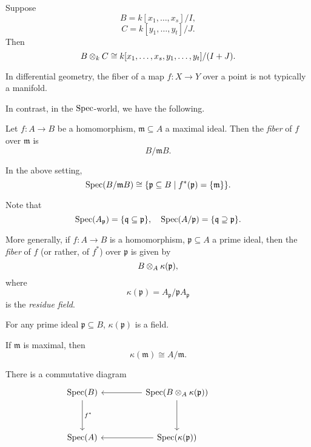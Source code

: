 \begin{corollary}
  Suppose
  \[ B = k[x_1, \dotsc, x_s] / {I},\]
  \[ C = k[y_1, \dotsc, y_t] /{J}.\]
  Then
  \[ B \otimes_k C \cong k[x_1, \dotsc, x_s, y_1, \dotsc, y_t] / {(I + J)}.\]
\end{corollary}

In differential geometry, the fiber of a map $f \colon X \to Y$ over a point is not typically a manifold.

In contrast, in the $\text{Spec}$-world, we have the following.

\begin{df}
  Let $f \colon A \to B$ be a homomorphism, $\mathfrak m \subseteq A$ a maximal ideal. Then the \textit{fiber} of $f$ over $\mathfrak m$ is
  \[ B /{\mathfrak m B}.\]
\end{df}

\begin{prop}
  In the above setting,
  \[\text{Spec}(B /{\mathfrak m B}) \cong \{ \mathfrak p \subseteq B \mathrel{|} f^*(\mathfrak p) = \{ \mathfrak m \} \}.\]
\end{prop}

Note that
\[ \text{Spec}(A_{\mathfrak p}) = \{ \mathfrak q \subseteq \mathfrak p\}, \quad
\text{Spec}(A /{\mathfrak p}) = \{ \mathfrak q \supseteq \mathfrak p\}.\]

\begin{df}
  More generally, if $f \colon A \to B$ is a homomorphism, $\mathfrak p \subseteq A$ a prime ideal, then the \textit{fiber} of $f$ (or rather, of \(f^*\)) over $\mathfrak p$ is given by
  \[ B \otimes_A \kappa(\mathfrak p),\]
  where
  \[ \kappa(\mathfrak p) = A_{\mathfrak p} / {\mathfrak p A_{\mathfrak p}}\]
  is the \textit{residue field}.
\end{df}

\begin{prop}
  For any prime ideal $\mathfrak p \subseteq B$, $\kappa(\mathfrak p)$ is a field.
\end{prop}

\begin{note}
  If $\mathfrak m$ is maximal, then
  \[ \kappa(\mathfrak m) \cong A / {\mathfrak m}.\]
\end{note}

\begin{prop}
  There is a commutative diagram
  \begin{equation*}
    \begin{tikzcd}[row sep = huge, column sep = huge]
      \spec(B) \arrow{d}{f^*}
      & \spec(B \tensor_A \kappa(\mathfrak p)) \arrow{l} \arrow{d} \\
      \spec(A) &
      \spec(\kappa(\mathfrak p)) \arrow{l}
      &
    \end{tikzcd}
  \end{equation*}
\end{prop}




